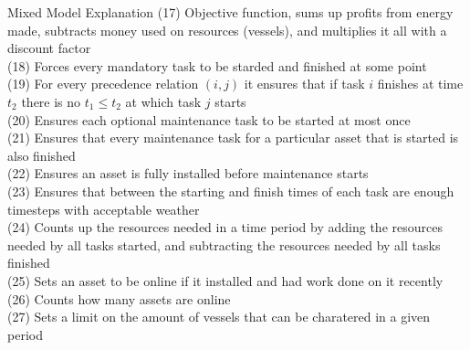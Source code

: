 \documentclass{beamer}
\begin{document}
\begin{frame}{Mixed Model Explanation}
\footnotesize
(17) Objective function, sums up profits from energy made, subtracts money used on resources (vessels), and multiplies it all with a discount factor	\\
(18) Forces every mandatory task to be starded and finished at some point	\\
(19) For every precedence relation $(i, j)$ it ensures that if task $i$ finishes at time $t_2$ there is no $t_1 \leq t_2$ at which task $j$ starts 	\\
(20) Ensures each optional maintenance task to be started at most once 	\\
(21) Ensures that every maintenance task for a particular asset that is started is also finished \\
(22) Ensures an asset is fully installed before maintenance starts	\\
(23) Ensures that between the starting and finish times of each task are enough timesteps with acceptable weather	\\
(24) Counts up the resources needed in a time period by adding the resources needed by all tasks started, and subtracting the resources needed by all tasks finished	\\
(25) Sets an asset to be online if it installed and had work done on it recently \\
(26) Counts how many assets are online \\
(27) Sets a limit on the amount of vessels that can be charatered in a given period
\end{frame}
\end{document}
